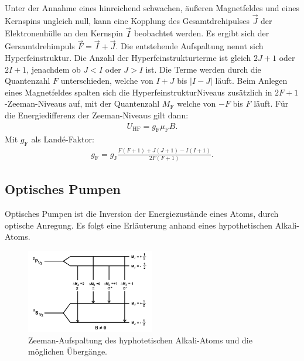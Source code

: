Unter der Annahme eines hinreichend schwachen, äußeren Magnetfeldes und eines Kernspins ungleich null, kann eine Kopplung des Gesamtdrehipulses $\vec{J}$ der
Elektronenhülle an den Kernspin $\vec{I}$ beobachtet werden. Es ergibt sich der Gersamtdrehimpuls $\vec{F}=\vec{I}+\vec{J}$.
Die entstehende Aufspaltung nennt sich Hyperfeinstruktur.
Die Anzahl der Hyperfeinstrukturterme ist gleich $2J+1$ oder $2I+1$, jenachdem ob $J<I$ oder $J>I$ ist.
Die Terme werden durch die Quantenzahl $F$ unterschieden, welche von $I+J$ bis $|I-J|$ läuft.
Beim Anlegen eines Magnetfeldes spalten sich die HyperfeinstrukturNiveaus zusätzlich in $2F+1$-Zeeman-Niveaus auf, mit der Quantenzahl $M_\mathrm{F}$
welche von $-F$ bis $F$ läuft.
Für die Energiedifferenz der Zeeman-Niveaus gilt dann:
\begin{align}
  U_\mathrm{HF}=g_\mathrm{F}\mu_\mathrm{F}B.
\end{align}
Mit $g_\mathrm{F}$ als Landé-Faktor:
\begin{align}
  g_\mathrm{F}=g_\mathrm{J}\frac{F(F+1)+J(J+1)-I(I+1)}{2F(F+1)}.\label{eqn:JI}
\end{align}

\subsection{Optisches Pumpen}
Optisches Pumpen ist die Inversion der Energiezustände eines Atoms, durch optische Anregung.
Es folgt eine Erläuterung anhand eines hypothetischen Alkali-Atoms.
\begin{figure}
    \centering
    \includegraphics[width=0.5\textwidth]{Uebergang.PNG}
    \caption{Zeeman-Aufspaltung des hyphotetischen Alkali-Atoms und die möglichen Übergänge.\cite{skript}}
    \label{fig:Uebergang}
\end{figure}

